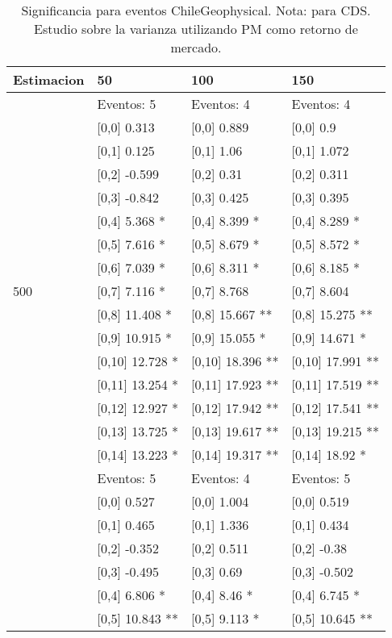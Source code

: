 \begin{table}

\caption{Significancia para eventos ChileGeophysical. Nota: para CDS. Estudio sobre la varianza utilizando PM como retorno de mercado.}
\centering
\begin{tabular}[t]{llll}
\toprule
Estimacion & 50 & 100 & 150\\
\midrule
 & Eventos:  5 & Eventos:  4 & Eventos:  4\\
 & {}[0,0] 0.313 & {}[0,0] 0.889 & {}[0,0] 0.9\\
 & {}[0,1] 0.125 & {}[0,1] 1.06 & {}[0,1] 1.072\\
 & {}[0,2] -0.599 & {}[0,2] 0.31 & {}[0,2] 0.311\\
 & {}[0,3] -0.842 & {}[0,3] 0.425 & {}[0,3] 0.395\\
\addlinespace
 & {}[0,4] 5.368 * & {}[0,4] 8.399 * & {}[0,4] 8.289 *\\
 & {}[0,5] 7.616 * & {}[0,5] 8.679 * & {}[0,5] 8.572 *\\
 & {}[0,6] 7.039 * & {}[0,6] 8.311 * & {}[0,6] 8.185 *\\
500 & {}[0,7] 7.116 * & {}[0,7] 8.768 & {}[0,7] 8.604\\
 & {}[0,8] 11.408 * & {}[0,8] 15.667 ** & {}[0,8] 15.275 **\\
\addlinespace
 & {}[0,9] 10.915 * & {}[0,9] 15.055 * & {}[0,9] 14.671 *\\
 & {}[0,10] 12.728 * & {}[0,10] 18.396 ** & {}[0,10] 17.991 **\\
 & {}[0,11] 13.254 * & {}[0,11] 17.923 ** & {}[0,11] 17.519 **\\
 & {}[0,12] 12.927 * & {}[0,12] 17.942 ** & {}[0,12] 17.541 **\\
 & {}[0,13] 13.725 * & {}[0,13] 19.617 ** & {}[0,13] 19.215 **\\
\addlinespace
 & {}[0,14] 13.223 * & {}[0,14] 19.317 ** & {}[0,14] 18.92 *\\
 & Eventos:  5 & Eventos:  4 & Eventos:  5\\
 & {}[0,0] 0.527 & {}[0,0] 1.004 & {}[0,0] 0.519\\
 & {}[0,1] 0.465 & {}[0,1] 1.336 & {}[0,1] 0.434\\
 & {}[0,2] -0.352 & {}[0,2] 0.511 & {}[0,2] -0.38\\
\addlinespace
 & {}[0,3] -0.495 & {}[0,3] 0.69 & {}[0,3] -0.502\\
 & {}[0,4] 6.806 * & {}[0,4] 8.46 * & {}[0,4] 6.745 *\\
 & {}[0,5] 10.843 ** & {}[0,5] 9.113 * & {}[0,5] 10.645 **\\

\end{tabular}
\end{table}
